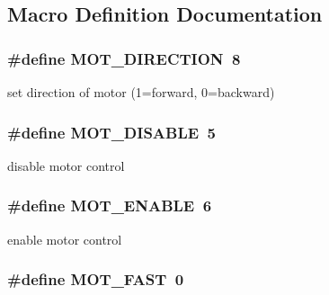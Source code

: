 \subsection{Macro Definition Documentation}
\hypertarget{group__motor__commands_gae0799d3b48368ff66fd88b500aab5d50}{
\subsubsection[{M\-O\-T\-\_\-\-D\-I\-R\-E\-C\-T\-I\-O\-N}]{\setlength{\rightskip}{0pt plus 5cm}\#define M\-O\-T\-\_\-\-D\-I\-R\-E\-C\-T\-I\-O\-N~8}}\label{group__motor__commands_gae0799d3b48368ff66fd88b500aab5d50}
set direction of motor (1=forward, 0=backward) \hypertarget{group__motor__commands_gae90f36d9158b625125ec5b6b6b12342d}{
\subsubsection[{M\-O\-T\-\_\-\-D\-I\-S\-A\-B\-L\-E}]{\setlength{\rightskip}{0pt plus 5cm}\#define M\-O\-T\-\_\-\-D\-I\-S\-A\-B\-L\-E~5}}\label{group__motor__commands_gae90f36d9158b625125ec5b6b6b12342d}
disable motor control \hypertarget{group__motor__commands_ga538be16bfce1294561c04bbfca368475}{
\subsubsection[{M\-O\-T\-\_\-\-E\-N\-A\-B\-L\-E}]{\setlength{\rightskip}{0pt plus 5cm}\#define M\-O\-T\-\_\-\-E\-N\-A\-B\-L\-E~6}}\label{group__motor__commands_ga538be16bfce1294561c04bbfca368475}
enable motor control \hypertarget{group__motor__commands_gae64835867a818685e7e9172a8cb21b9e}{
\subsubsection[{M\-O\-T\-\_\-\-F\-A\-S\-T}]{\setlength{\rightskip}{0pt plus 5cm}\#define M\-O\-T\-\_\-\-F\-A\-S\-T~0}}\label{group__motor__commands_gae64835867a818685e7e9172a8cb21b9e}
